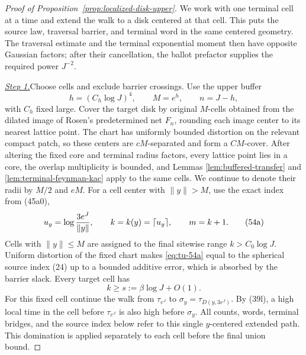 \begin{proof}[Proof of Proposition~\ref{prop:localized-disk-upper}]
We work with one terminal cell at a time and extend the walk to a disk
centered at that cell. This puts the source law, traversal barrier, and
terminal word in the same centered geometry. The traversal estimate and
the terminal exponential moment then have opposite Gaussian factors;
after their cancellation, the ballot prefactor supplies the required
power \(J^{-2}\).

\smallskip\noindent
\underline{\textit{Step 1.}}\quad Choose cells and exclude barrier crossings.
Use the upper buffer
\[
       h=(C_h\log J)^4,\qquad M=e^h,\qquad n=J-h,
\]
with \(C_h\) fixed large.  Cover the target disk by original \(M\)-cells
obtained from the dilated image of Rosen's predetermined net \(F_n\),
rounding each image center to its nearest lattice point.  The chart has
uniformly bounded distortion on the relevant compact patch, so these
centers are \(cM\)-separated and form a \(CM\)-cover.  After altering the
fixed core and terminal radius factors, every lattice point lies in a
core, the overlap multiplicity is bounded, and Lemmas
\ref{lem:buffered-transfer} and \ref{lem:terminal-feynman-kac}
apply to the same cells.  We continue to denote their radii by \(M/2\) and \(eM\).
For a cell center with \(\|y\|>M\), use the exact index from (45a0),
\begin{equation}
 u_y=\log {3e^J\over\|y\|},\qquad
 k=k(y)=\lceil u_y\rceil,\qquad m=k+1.                     \tag{54a}\label{eq:tu-54a}
\end{equation}
Cells with \(\|y\|\le M\) are assigned to the final sitewise range
\(k>C_0\log J\).  Uniform distortion of the fixed chart makes \eqref{eq:tu-54a}
equal to the spherical source index (24) up to a bounded additive error,
which is absorbed by the barrier slack.
Every target cell has
\begin{equation}
       k\ge s:=\beta\log J+O(1).                              \tag{54}\label{eq:tu-54}
\end{equation}
For this fixed cell continue the walk from \(\tau_{e^J}\) to
\(\sigma_y=\tau_{D(y,3e^J)}\).  By (39l), a high local time in the cell
before \(\tau_{e^J}\) is also high before \(\sigma_y\).  All counts,
words, terminal bridges, and the source index below refer to this single
\(y\)-centered extended path.  This domination is applied separately to
each cell before the final union bound.


\end{proof}
